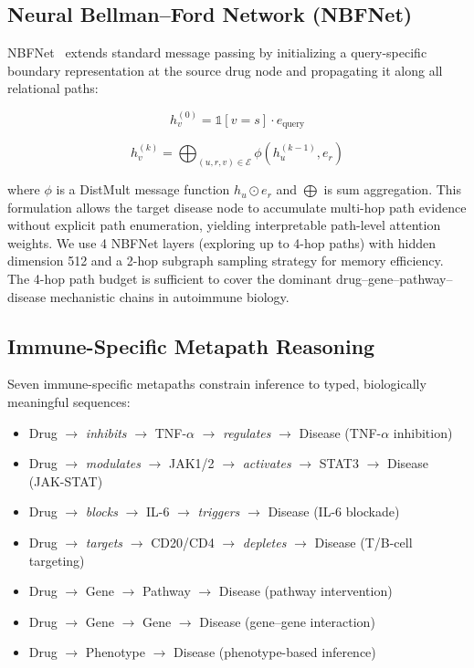 \documentclass[conference]{IEEEtran}
\begin{document}
\subsection{Neural Bellman--Ford Network (NBFNet)}

NBFNet~\cite{nbfnet} extends standard message passing by initializing a query-specific boundary representation at the source drug node and propagating it along all relational paths:

\begin{equation}
h_v^{(0)} = \mathbb{1}[v = s] \cdot e_{\text{query}}
\end{equation}

\begin{equation}
h_v^{(k)} = \bigoplus_{(u,r,v) \in \mathcal{E}} \phi\!\left(h_u^{(k-1)}, e_r\right)
\end{equation}

where $\phi$ is a DistMult message function $h_u \odot e_r$ and $\bigoplus$ is sum aggregation. This formulation allows the target disease node to accumulate multi-hop path evidence without explicit path enumeration, yielding interpretable path-level attention weights. We use 4 NBFNet layers (exploring up to 4-hop paths) with hidden dimension 512 and a 2-hop subgraph sampling strategy for memory efficiency. The 4-hop path budget is sufficient to cover the dominant drug--gene--pathway--disease mechanistic chains in autoimmune biology.

\subsection{Immune-Specific Metapath Reasoning}

Seven immune-specific metapaths constrain inference to typed, biologically meaningful sequences:
\begin{itemize}
    \item Drug $\to$ \textit{inhibits} $\to$ TNF-$\alpha$ $\to$ \textit{regulates} $\to$ Disease (TNF-$\alpha$ inhibition)
    \item Drug $\to$ \textit{modulates} $\to$ JAK1/2 $\to$ \textit{activates} $\to$ STAT3 $\to$ Disease (JAK-STAT)
    \item Drug $\to$ \textit{blocks} $\to$ IL-6 $\to$ \textit{triggers} $\to$ Disease (IL-6 blockade)
    \item Drug $\to$ \textit{targets} $\to$ CD20/CD4 $\to$ \textit{depletes} $\to$ Disease (T/B-cell targeting)
    \item Drug $\to$ Gene $\to$ Pathway $\to$ Disease (pathway intervention)
    \item Drug $\to$ Gene $\to$ Gene $\to$ Disease (gene--gene interaction)
    \item Drug $\to$ Phenotype $\to$ Disease (phenotype-based inference)
\end{itemize}
\end{document}
